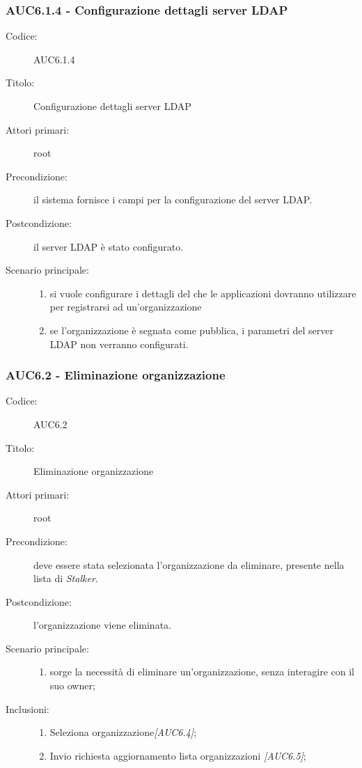 \documentclass[casi-duso]{subfiles}
\begin{document}
  \subsubsection{AUC6.1.4 - Configurazione dettagli server LDAP}%
  \label{subsub:AUC6.1.4}
  \begin{description}
    \item[Codice:] AUC6.1.4
    \item[Titolo:] Configurazione dettagli server LDAP
    \item[Attori primari:] root
    \item[Precondizione:] il sistema fornisce i campi per la configurazione del server LDAP.
    \item[Postcondizione:] il server LDAP è stato configurato.
    \item[Scenario principale:]
    \begin{enumerate}
      \item si vuole configurare i dettagli del  che le applicazioni dovranno utilizzare per registrarsi ad un'organizzazione
      \item se l'organizzazione è segnata come pubblica, i parametri del server LDAP non verranno configurati.
    \end{enumerate}
  \end{description}

\subsubsection{AUC6.2 - Eliminazione organizzazione}%
\label{subsub:AUC6.2}
\begin{description}
  \item[Codice:] AUC6.2
  \item[Titolo:] Eliminazione organizzazione
  \item[Attori primari:] root
  \item[Precondizione:] deve essere stata selezionata l'organizzazione da eliminare, presente nella lista di \emph{Stalker}.
  \item[Postcondizione:] l'organizzazione viene eliminata.
  \item[Scenario principale:]
  \begin{enumerate}
    \item sorge la necessità di eliminare un'organizzazione, senza interagire con il suo owner;
  \end{enumerate}
  \item[Inclusioni:]
  \begin{enumerate}
    \item Seleziona organizzazione\emph{[AUC6.4]};
    \item Invio richiesta aggiornamento lista organizzazioni \emph{[AUC6.5]};
  \end{enumerate}
\end{description}
\end{document}
